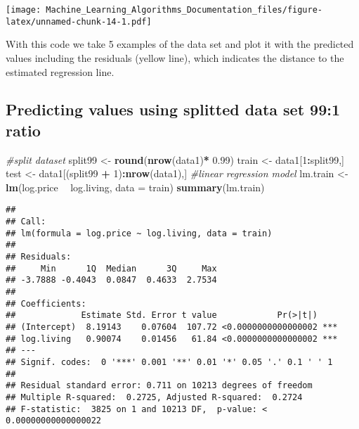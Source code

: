\documentclass[
]{article}
\newenvironment{Shaded}{\begin{snugshade}}{\end{snugshade}}
\newcommand{\CommentTok}[1]{\textcolor[rgb]{0.56,0.35,0.01}{\textit{#1}}}
\newcommand{\DataTypeTok}[1]{\textcolor[rgb]{0.13,0.29,0.53}{#1}}
\newcommand{\DecValTok}[1]{\textcolor[rgb]{0.00,0.00,0.81}{#1}}
\newcommand{\FloatTok}[1]{\textcolor[rgb]{0.00,0.00,0.81}{#1}}
\newcommand{\KeywordTok}[1]{\textcolor[rgb]{0.13,0.29,0.53}{\textbf{#1}}}
\newcommand{\NormalTok}[1]{#1}
\newcommand{\OperatorTok}[1]{\textcolor[rgb]{0.81,0.36,0.00}{\textbf{#1}}}
\newcommand{\StringTok}[1]{\textcolor[rgb]{0.31,0.60,0.02}{#1}}
\begin{document}
\texttt{[image: Machine\_Learning\_Algorithms\_Documentation\_files/figure-latex/unnamed-chunk-14-1.pdf]}

With this code we take 5 examples of the data set and plot it with the
predicted values including the residuals (yellow line), which indicates
the distance to the estimated regression line.

\hypertarget{predicting-values-using-splitted-data-set-991-ratio}{%
\subsection{Predicting values using splitted data set 99:1
ratio}\label{predicting-values-using-splitted-data-set-991-ratio}}

\begin{Shaded}
\begin{Highlighting}[]
\CommentTok{#split dataset }
\NormalTok{split99 <-}\StringTok{ }\KeywordTok{round}\NormalTok{(}\KeywordTok{nrow}\NormalTok{(data1)}\OperatorTok{*}\StringTok{ }\FloatTok{0.99}\NormalTok{)}
\NormalTok{train <-}\StringTok{ }\NormalTok{data1[}\DecValTok{1}\OperatorTok{:}\NormalTok{split99,]}
\NormalTok{test <-}\StringTok{ }\NormalTok{data1[(split99 }\OperatorTok{+}\StringTok{ }\DecValTok{1}\NormalTok{)}\OperatorTok{:}\KeywordTok{nrow}\NormalTok{(data1),]}
\CommentTok{#linear regression model}
\NormalTok{lm.train <-}\StringTok{ }\KeywordTok{lm}\NormalTok{(log.price }\OperatorTok{~}\StringTok{ }\NormalTok{log.living, }\DataTypeTok{data =}\NormalTok{ train)}
\KeywordTok{summary}\NormalTok{(lm.train)}
\end{Highlighting}
\end{Shaded}

\begin{verbatim}
## 
## Call:
## lm(formula = log.price ~ log.living, data = train)
## 
## Residuals:
##     Min      1Q  Median      3Q     Max 
## -3.7888 -0.4043  0.0847  0.4633  2.7534 
## 
## Coefficients:
##             Estimate Std. Error t value            Pr(>|t|)    
## (Intercept)  8.19143    0.07604  107.72 <0.0000000000000002 ***
## log.living   0.90074    0.01456   61.84 <0.0000000000000002 ***
## ---
## Signif. codes:  0 '***' 0.001 '**' 0.01 '*' 0.05 '.' 0.1 ' ' 1
## 
## Residual standard error: 0.711 on 10213 degrees of freedom
## Multiple R-squared:  0.2725, Adjusted R-squared:  0.2724 
## F-statistic:  3825 on 1 and 10213 DF,  p-value: < 0.00000000000000022
\end{verbatim}
\end{document}
